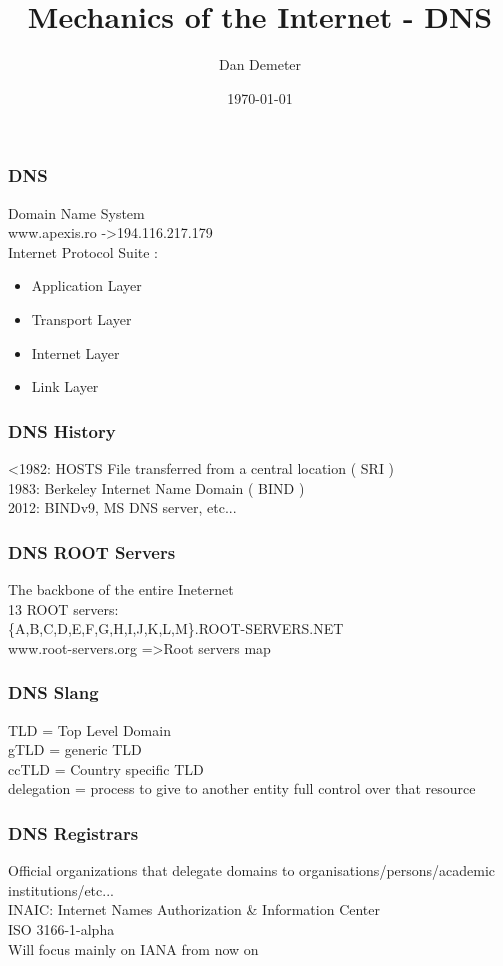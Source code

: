 \documentclass{beamer}
\title[Domain Name System]{Mechanics of the Internet - DNS}
\author{Dan Demeter}
\institute[Imperial College London]{Imperial College London}
\date{\today}
\begin{document}
\begin{frame}
\titlepage
\end{frame}
%

\begin{frame}
\frametitle{DNS}
Domain Name System\\
www.apexis.ro -\textgreater 194.116.217.179\\
\vspace{0.5cm}
Internet Protocol Suite	:
\begin{itemize}
  \item \alert{Application Layer}
  \item Transport Layer
  \item Internet Layer
  \item Link Layer
\end{itemize}  
\end{frame}


\begin{frame}
\frametitle{DNS History}

\textless 1982: HOSTS File transferred from a central location ( SRI )\\
\vspace{0.5cm}
1983: Berkeley Internet Name Domain ( BIND )\\
2012: BINDv9, MS DNS server, etc...\\
\end{frame}

\begin{frame}
\frametitle{DNS ROOT Servers}
The backbone of the entire Ineternet\\
13 ROOT servers:\\
\{A,B,C,D,E,F,G,H,I,J,K,L,M\}.ROOT-SERVERS.NET\\
\vspace{0.5cm}
www.root-servers.org =\textgreater Root servers map
\end{frame}

\begin{frame}
\frametitle{DNS Slang}
TLD = Top Level Domain \\
gTLD = generic TLD\\
ccTLD = Country specific TLD\\
delegation = process to give to another entity full control over that resource\\
\end{frame}



\begin{frame}
\frametitle{DNS Registrars}
Official organizations that delegate domains to organisations/persons/academic institutions/etc...\\
\vspace{0.5cm}
\pause
INAIC: Internet Names Authorization \& Information Center\\
\vspace{0.5cm}
\pause
ISO 3166-1-alpha\\
\pause
Will focus mainly on IANA from now on
\end{frame}
\end{document}
